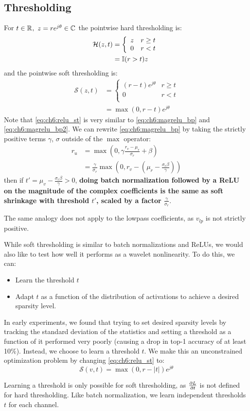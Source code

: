\subsection{Thresholding}
For $t \in \mathbb{R}^{},\ z = re^{j\theta} \in \mathbb{C}^{}$ the pointwise hard thresholding is:
\begin{align}
  \mathcal{H}(z, t) &= \left\{ \begin{array}{ll}
    z & r \geq t \\
    0 & r < t\\
  \end{array} \right. \\
  &= \mathbb{I}(r > t) z
\end{align}
and the pointwise soft thresholding is:
\begin{align}
  \mathcal{S}(z, t) &= \left\{ \begin{array}{ll}
    (r-t)e^{j\theta} & r \geq t \\
    0 & r < t\\
  \end{array} \right. \\
  &= \max(0, r - t)e^{j\theta} \label{eq:ch6:relu_st}
\end{align}
Note that \eqref{eq:ch6:relu_st} is very similar to \eqref{eq:ch6:magrelu_bp} and \eqref{eq:ch6:magrelu_bp2}.
We can rewrite \eqref{eq:ch6:magrelu_bp} by taking the strictly positive terms
$\gamma$, $\sigma$ outside of the $\max$ operator:
\begin{align}
  r_u &= \max(0, \gamma \frac{r_v-\mu_r}{\sigma_r} + \beta) \\
      &= \frac{\gamma}{\sigma_r}\max\left(0, r_v - \left(\mu_r - \frac{\sigma_r\beta}{\gamma}\right)\right) \label{eq:ch6:bnrelu_soft}
\end{align}
then if $t' = \mu_v - \frac{\sigma_r\beta}{\gamma} > 0$, \textbf{doing batch
normalization followed by a ReLU on the magnitude of the complex coefficients is the
same as soft shrinkage with threshold $t'$, scaled by a factor
$\frac{\gamma}{\sigma_r}$}.

The same analogy does not apply to the lowpass
coefficients, as $v_{lp}$ is not strictly positive.

While soft thresholding is similar to batch normalizations and ReLUs, we would also like
to test how well it performs as a wavelet nonlinearity.
To do this, we can:
\begin{itemize}
  \item Learn the threshold $t$
  \item Adapt $t$ as a function of the distribution of activations to achieve a desired sparsity level.
\end{itemize}
In early experiments, we found that trying to set
desired sparsity levels by tracking the standard deviation of the statistics
and setting a threshold as a function of it performed very poorly (causing a
drop in top-1 accuracy of at least 10\%).
Instead, we choose to learn a threshold $t$. We make this an unconstrained
optimization problem by changing \eqref{eq:ch6:relu_st} to:
\begin{equation}
  \mathcal{S}(v, t) = \max(0, r-|t|)e^{j\theta}  \label{eq:ch6:relu_st2}
\end{equation}

Learning a threshold is only possible for soft thresholding, as $\frac{\partial L}{\partial t}$ is
not defined for hard thresholding. Like batch normalization, we learn
independent thresholds $t$ for each channel.
